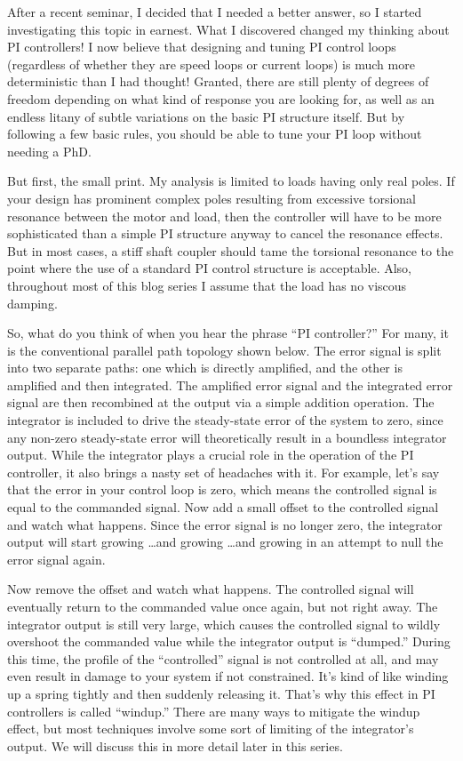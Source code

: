 After a recent seminar, I decided that I needed a better answer, so I started investigating this topic in earnest.  What I discovered changed my thinking about PI controllers!  I now believe that designing and tuning PI control loops (regardless of whether they are speed loops or current loops) is much more deterministic than I had thought!  Granted, there are still plenty of degrees of freedom depending on what kind of response you are looking for, as well as an endless litany of subtle variations on the basic PI structure itself.  But by following a few basic rules, you should be able to tune your PI loop without needing a PhD.

But first, the small print.  My analysis is limited to loads having only real poles.  If your design has prominent complex poles resulting from excessive torsional resonance between the motor and load, then the controller will have to be more sophisticated than a simple PI structure anyway to cancel the resonance effects.  But in most cases, a stiff shaft coupler should tame the torsional resonance to the point where the use of a standard PI control structure is acceptable.  Also, throughout most of this blog series I assume that the load has no viscous damping.

So, what do you think of when you hear the phrase “PI controller?”  For many, it is the conventional parallel path topology shown below.  The error signal is split into two separate paths: one which is directly amplified, and the other is amplified and then integrated.  The amplified error signal and the integrated error signal are then recombined at the output via a simple addition operation.  The integrator is included to drive the steady-state error of the system to zero, since any non-zero steady-state error will theoretically result in a boundless integrator output.  While the integrator plays a crucial role in the operation of the PI controller, it also brings a nasty set of headaches with it.  For example, let’s say that the error in your control loop is zero, which means the controlled signal is equal to the commanded signal.  Now add a small offset to the controlled signal and watch what happens.  Since the error signal is no longer zero, the integrator output will start growing …and growing …and growing in an attempt to null the error signal again.

Now remove the offset and watch what happens.  The controlled signal will eventually return to the commanded value once again, but not right away.  The integrator output is still very large, which causes the controlled signal to wildly overshoot the commanded value while the integrator output is “dumped.”  During this time, the profile of the “controlled” signal is not controlled at all, and may even result in damage to your system if not constrained.  It’s kind of like winding up a spring tightly and then suddenly releasing it.  That’s why this effect in PI controllers is called “windup.”  There are many ways to mitigate the windup effect, but most techniques involve some sort of limiting of the integrator’s output.  We will discuss this in more detail later in this series.

